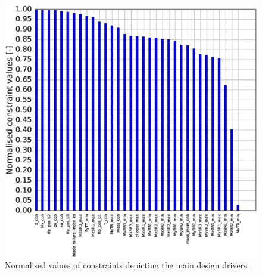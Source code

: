 \begin{figure}[pht]
\begin{center}
	\includegraphics[width=.85\linewidth]{figures/KB6_final/KB6_cons_list.eps}
\end{center}
\caption{Normalised values of constraints depicting the main design drivers.}
\label{fig:KB6_cons}
\end{figure}




